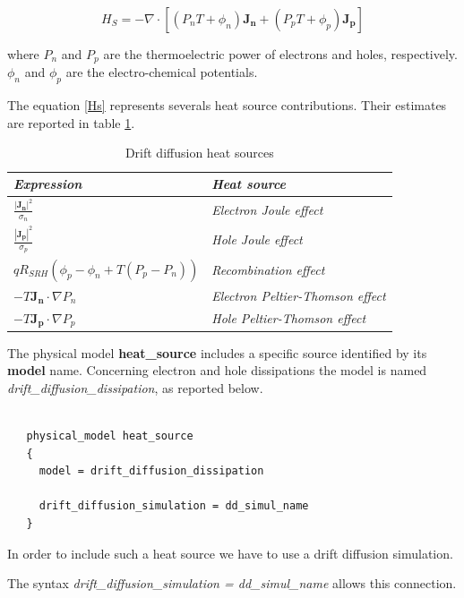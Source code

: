 \begin{equation}\label{Hs}
H_{S} =-\nabla \cdot \left[(P_n T + \phi_n)\mathbf{J_n} + (P_p T + \phi_p)\mathbf{J_p}\right] 
\end{equation}

where $P_n$ and $P_p$ are the thermoelectric power of electrons and holes, respectively. $\phi_n$ and $\phi_p$ are the electro-chemical potentials.

The equation \ref{Hs} represents severals heat source contributions. Their estimates are reported in table \ref{table:heat_sources}. 

\begin{table}[htb]
\center
\begin{tabular}{l||l}
\textit{Expression} & \textit{Heat source}\\
\hline\hline
$\frac{\left| \mathbf{J_n} \right| ^2}{\sigma_n}$ & \textit{Electron Joule effect}\\
$\frac{|\mathbf{J_p}|^2}{\sigma_p}$ & \textit{Hole Joule effect}\\
$qR_{SRH}\left(\phi_p - \phi_n + T \left( P_p - P_n \right) \right)$ & \textit{Recombination effect}\\
$ -T \mathbf{J_n} \cdot \nabla P_n $ & \textit{Electron Peltier-Thomson effect}\\
$ -T \mathbf{J_p} \cdot \nabla P_p $ & \textit{Hole Peltier-Thomson effect}
\end{tabular}
\caption{Drift diffusion heat sources}
\label{table:heat_sources}
\end{table}





The physical model \textbf{heat\_source} includes a specific source identified by its \textbf{model} name.
Concerning electron and hole dissipations the model is
named \textit{drift\_diffusion\_dissipation}, as reported below.

\begin{verbatim}

   physical_model heat_source
   {		
     model = drift_diffusion_dissipation

     drift_diffusion_simulation = dd_simul_name
   }

\end{verbatim}

In order to include such a heat source we have to use a drift diffusion simulation.

The syntax \textit{drift\_diffusion\_simulation = dd\_simul\_name} allows this connection.




